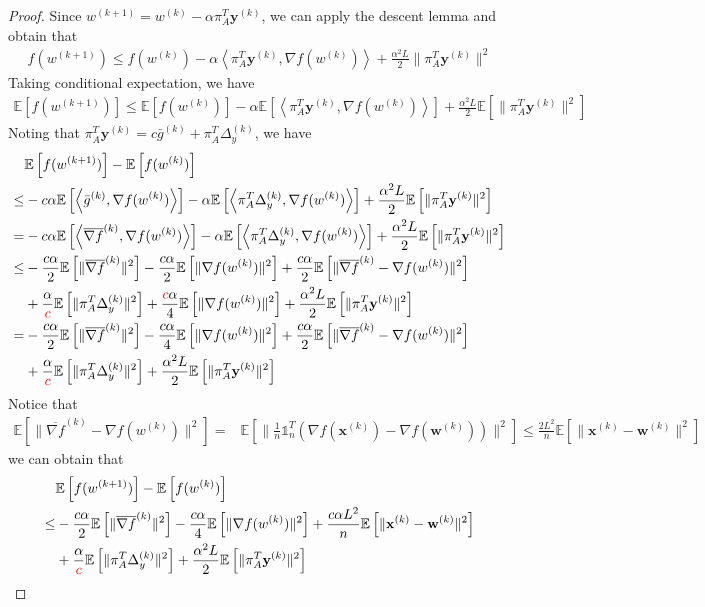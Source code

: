 \documentclass{article}
\newcommand{\vw}{{\mathbf{w}}}
\newcommand{\vx}{{\mathbf{x}}}
\newcommand{\vy}{{\mathbf{y}}}
\newcommand{\EE}[1]{\mathbb{E}\left[#1\right]}
\newcommand{\norm}[1]{\| #1 \|}
\newcommand{\ip}[1]{\left\langle#1\right\rangle}
\newcommand{\one}{\mathds{1}_n}
\begin{document}
\begin{proof}
  Since $w^{(k+1)}=w^{(k)}-\alpha\pi_{A}^T\vy^{(k)}$, we can apply the descent lemma and obtain that
  \begin{align*}
    f(w^{(k+1)})\leq f(w^{(k)})-\alpha \ip{\pi_{A}^T\vy^{(k)},\nabla f(w^{(k)})}+\frac{\alpha^2L}{2}\norm{\pi_{A}^T\vy^{(k)}}^2
  \end{align*}
  Taking conditional expectation, we have
  \begin{align*}
    \EE{f(w^{(k+1)})}\leq \EE{f(w^{(k)})}-\alpha \EE{\ip{\pi_{A}^T\vy^{(k)},\nabla f(w^{(k)})}}+\frac{\alpha^2L}{2}\EE{\norm{\pi_{A}^T\vy^{(k)}}^2}
  \end{align*}
  Noting that $\pi_A^T\vy^{(k)}=c\bar{g}^{(k)}+\pi_A^T\Delta_{y}^{(k)}$, we have 
  \begin{align*}
    &\EE{f(w^{(k+1)})}-\EE{f(w^{(k)})}\\ 
    \leq& -c\alpha \EE{\ip{\bar{g}^{(k)},\nabla f(w^{(k)})}}-\alpha \EE{\ip{\pi_{A}^T\Delta_{y}^{(k)},\nabla f(w^{(k)})}}+\frac{\alpha^2L}{2}\EE{\norm{\pi_{A}^T\vy^{(k)}}^2}\\
    =&-c\alpha \EE{\ip{\overline{\nabla f}^{(k)},\nabla f(w^{(k)})}}-\alpha \EE{\ip{\pi_{A}^T\Delta_{y}^{(k)},\nabla f(w^{(k)})}}+\frac{\alpha^2L}{2}\EE{\norm{\pi_{A}^T\vy^{(k)}}^2}\\
    \leq & -\frac{c\alpha}{2}\EE{\norm{\overline{\nabla f}^{(k)}}^2}-\frac{c\alpha}{2}\EE{\norm{\nabla f(w^{(k)})}^2}+\frac{c\alpha}{2}\EE{\norm{\overline{\nabla f}^{(k)}-\nabla f(w^{(k)})}^2}\\&+\frac{\alpha}{\textcolor{red}{c}}\EE{\norm{\pi_{A}^T\Delta_{y}^{(k)}}^2}+\frac{\textcolor{red}{c}\alpha}{4}\EE{\norm{\nabla f(w^{(k)})}^2}+\frac{\alpha^2L}{2}\EE{\norm{\pi_{A}^T\vy^{(k)}}^2}\\
    =&-\frac{c\alpha}{2}\EE{\norm{\overline{\nabla f}^{(k)}}^2}-\frac{c\alpha}{4}\EE{\norm{\nabla f(w^{(k)})}^2}+\frac{c\alpha}{2}\EE{\norm{\overline{\nabla f}^{(k)}-\nabla f(w^{(k)})}^2}\\&+\frac{\alpha}{\textcolor{red}{c}}\EE{\norm{\pi_{A}^T\Delta_{y}^{(k)}}^2}+\frac{\alpha^2L}{2}\EE{\norm{\pi_{A}^T\vy^{(k)}}^2}
  \end{align*}
Notice that 
\begin{align*}
\EE{\norm{\overline{\nabla f}^{(k)}-\nabla f(w^{(k)})}^2}=&\EE{\norm{\frac{1}{n}\one^T(\nabla f(\vx^{(k)})-\nabla f(\vw^{(k)}))}^2}\leq  \frac{2L^2}{n}\EE{\norm{\vx^{(k)}-\vw^{(k)}}^2}
\end{align*}
we can obtain that
\begin{align*}
  &\EE{f(w^{(k+1)})}-\EE{f(w^{(k)})}\\ 
  \leq&-\frac{c\alpha}{2}\EE{\norm{\overline{\nabla f}^{(k)}}^2}-\frac{c\alpha}{4}\EE{\norm{\nabla f(w^{(k)})}^2}+\frac{c\alpha L^2}{n}\EE{\norm{\vx^{(k)}-\vw^{(k)}}^2} \\&+\frac{\alpha}{\textcolor{red}{c}}\EE{\norm{\pi_{A}^T\Delta_{y}^{(k)}}^2}+\frac{\alpha^2L}{2}\EE{\norm{\pi_{A}^T\vy^{(k)}}^2}
\end{align*}


\end{proof}
\end{document}
